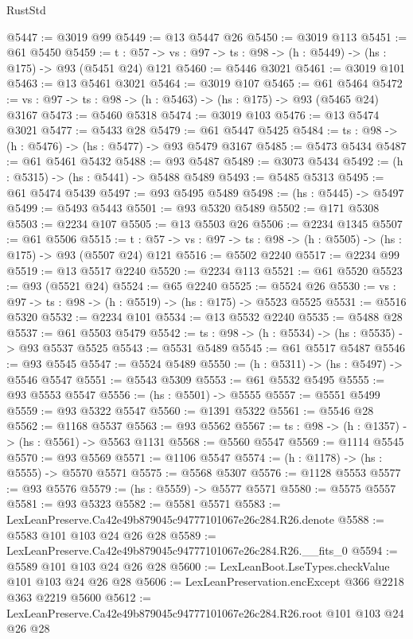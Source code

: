 \begin{lexlean}{RustStd}
\begin{coremodule}
@5447 := @3019 @99
@5449 := @13 @5447 @26
@5450 := @3019 @113
@5451 := @61 @5450
@5459 := {t : @57} -> {vs : @97} -> {ts : @98} -> (h : @5449) -> (hs : @175) -> @93 (@5451 @24) @121
@5460 := @5446 @3021
@5461 := @3019 @101
@5463 := @13 @5461 @3021
@5464 := @3019 @107
@5465 := @61 @5464
@5472 := {vs : @97} -> {ts : @98} -> (h : @5463) -> (hs : @175) -> @93 (@5465 @24) @3167
@5473 := @5460 @5318
@5474 := @3019 @103
@5476 := @13 @5474 @3021
@5477 := @5433 @28
@5479 := @61 @5447 @5425
@5484 := {ts : @98} -> (h : @5476) -> (hs : @5477) -> @93 @5479 @3167
@5485 := @5473 @5434
@5487 := @61 @5461 @5432
@5488 := @93 @5487
@5489 := @3073 @5434
@5492 := (h : @5315) -> (hs : @5441) -> @5488 @5489
@5493 := @5485 @5313
@5495 := @61 @5474 @5439
@5497 := @93 @5495 @5489
@5498 := (hs : @5445) -> @5497
@5499 := @5493 @5443
@5501 := @93 @5320 @5489
@5502 := @171 @5308
@5503 := @2234 @107
@5505 := @13 @5503 @26
@5506 := @2234 @1345
@5507 := @61 @5506
@5515 := {t : @57} -> {vs : @97} -> {ts : @98} -> (h : @5505) -> (hs : @175) -> @93 (@5507 @24) @121
@5516 := @5502 @2240
@5517 := @2234 @99
@5519 := @13 @5517 @2240
@5520 := @2234 @113
@5521 := @61 @5520
@5523 := @93 (@5521 @24)
@5524 := @65 @2240
@5525 := @5524 @26
@5530 := {vs : @97} -> {ts : @98} -> (h : @5519) -> (hs : @175) -> @5523 @5525
@5531 := @5516 @5320
@5532 := @2234 @101
@5534 := @13 @5532 @2240
@5535 := @5488 @28
@5537 := @61 @5503 @5479
@5542 := {ts : @98} -> (h : @5534) -> (hs : @5535) -> @93 @5537 @5525
@5543 := @5531 @5489
@5545 := @61 @5517 @5487
@5546 := @93 @5545
@5547 := @5524 @5489
@5550 := (h : @5311) -> (hs : @5497) -> @5546 @5547
@5551 := @5543 @5309
@5553 := @61 @5532 @5495
@5555 := @93 @5553 @5547
@5556 := (hs : @5501) -> @5555
@5557 := @5551 @5499
@5559 := @93 @5322 @5547
@5560 := @1391 @5322
@5561 := @5546 @28
@5562 := @1168 @5537
@5563 := @93 @5562
@5567 := {ts : @98} -> (h : @1357) -> (hs : @5561) -> @5563 @1131
@5568 := @5560 @5547
@5569 := @1114 @5545
@5570 := @93 @5569
@5571 := @1106 @5547
@5574 := (h : @1178) -> (hs : @5555) -> @5570 @5571
@5575 := @5568 @5307
@5576 := @1128 @5553
@5577 := @93 @5576
@5579 := (hs : @5559) -> @5577 @5571
@5580 := @5575 @5557
@5581 := @93 @5323
@5582 := @5581 @5571
@5583 := LexLeanPreserve.Ca42e49b879045c94777101067e26c284.R26.denote
@5588 := @5583 @101 @103 @24 @26 @28
@5589 := LexLeanPreserve.Ca42e49b879045c94777101067e26c284.R26.__fits_0
@5594 := @5589 @101 @103 @24 @26 @28
@5600 := LexLeanBoot.LseTypes.checkValue @101 @103 @24 @26 @28
@5606 := LexLeanPreservation.encExcept @366 @2218 @363 @2219 @5600
@5612 := LexLeanPreserve.Ca42e49b879045c94777101067e26c284.R26.root @101 @103 @24 @26 @28

\end{coremodule}
\end{lexlean}
